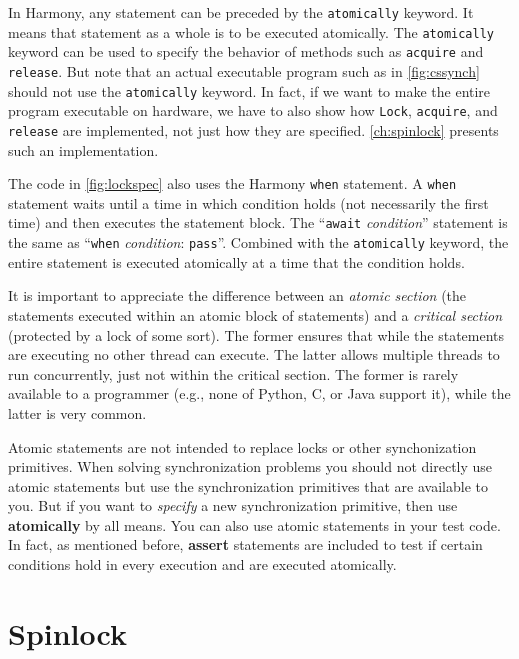 \documentclass{report}
\begin{document}
In Harmony, any statement can be preceded by the \texttt{atomically}
keyword.  It means that statement as a whole is to be executed atomically.
The \texttt{atomically} keyword can be used to specify the behavior of
methods such as \texttt{acquire} and \texttt{release}.  But note that
an actual executable program such as in \autoref{fig:cssynch} should not
use the \texttt{atomically} keyword.
In fact, if we want to make the entire program executable on hardware,
we have to also show how \texttt{Lock}, \texttt{acquire}, and \texttt{release}
are implemented, not just how they are specified.
\autoref{ch:spinlock} presents such an implementation.

The code in \autoref{fig:lockspec} also uses the Harmony \texttt{when}
statement.  A \texttt{when} statement waits until a time in which
condition holds (not necessarily the first time) and then executes the
statement block.  The ``\texttt{await} \textit{condition}'' statement is
the same as ``\texttt{when} \textit{condition}: \texttt{pass}''.
Combined with the \texttt{atomically} keyword, the entire statement
is executed atomically at a time that the condition holds.

It is important to appreciate the difference between an
\emph{atomic section} (the statements executed within an
atomic block of statements) and a \emph{critical section}
(protected by a lock of some sort).
The former ensures that while the
statements are executing no other thread can execute.
The latter allows multiple threads to run concurrently,
just not within the critical section.
The former is rarely available to a programmer (e.g., none of
Python, C, or Java support it), while the latter
is very common.

Atomic statements
are not intended to replace locks or other synchonization primitives.
When solving synchronization problems you should not directly use
atomic statements but use the synchronization primitives that are available
to you.  But if you want to \emph{specify} a new synchronization primitive,
then use \textbf{atomically} by all means.
You can also use atomic statements in your test code.
In fact, as mentioned before, \textbf{assert} statements are included to
test if certain conditions hold in every execution and are executed
atomically.

\chapter{Spinlock}
\label{ch:spinlock}
%
\end{document}
